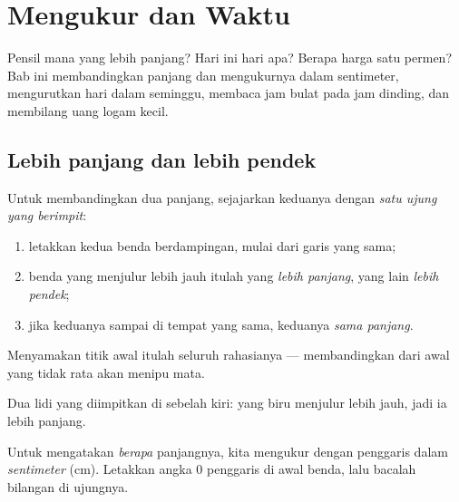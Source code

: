 \chapter{Mengukur dan Waktu}\label{ch:g1:measure}

Pensil mana yang lebih panjang? Hari ini hari apa? Berapa harga satu
permen? Bab ini membandingkan panjang dan mengukurnya dalam
sentimeter, mengurutkan hari dalam seminggu, membaca jam bulat pada
jam dinding, dan membilang uang logam kecil.

\section{Lebih panjang dan lebih pendek}

\begin{method}\label{met:g1:measure:compare}
Untuk membandingkan dua panjang, sejajarkan keduanya dengan
\emph{satu ujung yang berimpit}:
\begin{enumerate}
  \item letakkan kedua benda berdampingan, mulai dari garis yang sama;
  \item benda yang menjulur lebih jauh itulah yang \emph{lebih
        panjang}, yang lain \emph{lebih pendek};
  \item jika keduanya sampai di tempat yang sama, keduanya
        \emph{sama panjang}.
\end{enumerate}
Menyamakan titik awal itulah seluruh rahasianya --- membandingkan
dari awal yang tidak rata akan menipu mata.
\end{method}

\begin{omfigure}

{\small Dua lidi yang diimpitkan di sebelah kiri: yang biru menjulur
lebih jauh, jadi ia lebih panjang.}
\end{omfigure}

\begin{definition}[Sentimeter]\label{def:g1:measure:cm}
Untuk mengatakan \emph{berapa} panjangnya, kita mengukur dengan
penggaris dalam \emph{sentimeter} (cm). Letakkan angka $0$ penggaris
di awal benda, lalu bacalah bilangan di ujungnya.
\end{definition}

